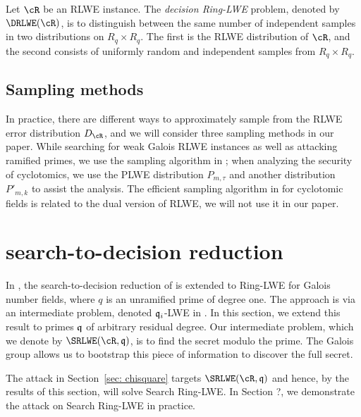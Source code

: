 \documentclass{amsart}
\begin{document}
\begin{Definition}
Let $\cR$ be an RLWE instance. The {\it decision Ring-LWE}
problem, denoted by $\DRLWE(\cR)$, is to distinguish between the same number of independent samples in two distributions on $R_q \times R_q$. The first is the RLWE distribution of $\cR$, and the second consists of uniformly random and independent samples from $R_q \times R_q$.
\end{Definition}

\subsection{Sampling methods}
In practice, there are different ways to approximately sample from the RLWE error distribution $D_\cR$, and we will consider three sampling methods in our paper. While searching for weak Galois RLWE instances as well as attacking ramified primes, we use the sampling algorithm in  \cite{gentry2008trapdoors}; when analyzing the security of cyclotomics, we use the PLWE distribution $P_{m,\tau}$ and another distribution $P'_{m,k}$ to assist the analysis. The efficient sampling algorithm in \cite{lyubashevsky2013toolkit} for cyclotomic fields is related to the dual version of RLWE, we will not use it in our paper.


\section{search-to-decision reduction}
\label{sec: s-to-d}

In \cite{eisentrager2014weak}, the search-to-decision reduction of \cite{LPR?} is extended to Ring-LWE for Galois number fields, where $q$ is an unramified prime of degree one.  The approach is via an intermediate problem, denoted $\mathfrak{q}_i$-LWE in \cite{lyubashevsky2013ideal}.  In this section, we extend this result to primes $\mathfrak{q}$ of arbitrary residual degree.  Our intermediate problem, which we denote by $\SRLWE(\cR,\fq)$, is to find the secret modulo the prime.  The Galois group allows us to bootstrap this piece of information to discover the full secret.

The attack in Section~\ref{sec: chisquare} targets $\SRLWE(\cR,\fq)$ and hence, by the results of this section, will solve Search Ring-LWE.  In Section ?, we demonstrate the attack on Search Ring-LWE in practice.

\end{document}
